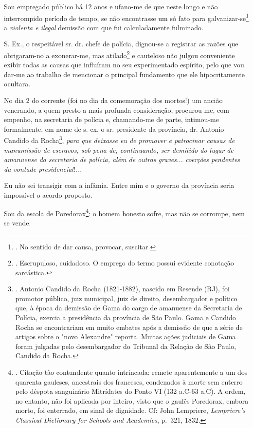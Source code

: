Sou empregado público há 12 anos e ufano-me de que neste longo e não
interrompido período de tempo, se não encontrasse um só fato para
galvanizar-se\footnote{. No sentido de dar causa, provocar, suscitar.} a
\emph{violenta e ilegal} demissão com que fui calculadamente fulminado.

S. Ex., o respeitável sr. dr. chefe de polícia, dignou-se a registrar as
razões que obrigaram-no a exonerar-me, mas atilado\footnote{.
  Escrupuloso, cuidadoso. O emprego do termo possui evidente conotação
  sarcástica.} e cauteloso não julgou conveniente exibir todas as causas
que influíram no seu experimentado espírito, pelo que vou dar-me ao
trabalho de mencionar o principal fundamento que ele hipocritamente
ocultara.

No dia 2 do corrente (foi no dia da comemoração dos mortos!) um ancião
venerando, a quem presto a mais profunda consideração, procurou-me, com
empenho, na secretaria de polícia e, chamando-me de parte, intimou-me
formalmente, em nome de s. ex. o sr. presidente da província, dr.
Antonio Candido da Rocha\footnote{. Antonio Candido da Rocha
  (1821-1882), nascido em Resende (RJ), foi promotor público, juiz
  municipal, juiz de direito, desembargador e político que, à época da
  demissão de Gama do cargo de amanuense da Secretaria de Polícia,
  exercia a presidência da província de São Paulo. Gama e Candido Rocha
  se encontrariam em muito embates após a demissão de que a série de
  artigos sobre o "novo Alexandre" reporta. Muitas ações judiciais de
  Gama foram julgadas pelo desembargador do Tribunal da Relação de São
  Paulo, Candido da Rocha.}, \emph{para que deixasse eu de promover e
patrocinar causas de manumissão de escravos, sob pena de, continuando,
ser demitido do lugar de amanuense da secretaria de polícia, além de
outras graves... coerções pendentes da vontade presidencial}!...

Eu não sei transigir com a infâmia. Entre mim e o governo da província
seria impossível o acordo proposto.

Sou da escola de Poredorax\footnote{. Citação tão contundente quanto
  intrincada: remete aparentemente a um dos quarenta gauleses,
  ancestrais dos franceses, condenados à morte sem enterro pelo déspota
  sanguinário Mitrídates do Ponto VI (132 a.C-63 a.C). A ordem, no
  entanto, não foi aplicada por inteiro, visto que o gaulês Poredorax,
  embora morto, foi enterrado, em sinal de dignidade. Cf: John
  Lempriere, \emph{Lempriere's Classical Dictionary for Schools and
  Academies}, p.~321, 1832.}: o homem honesto sofre, mas não se
corrompe, nem se vende.

